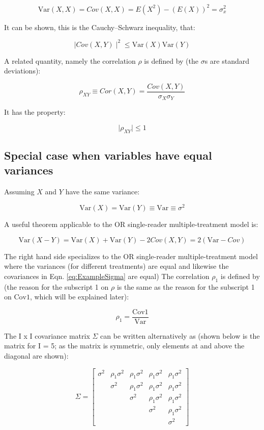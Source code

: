 \documentclass[
]{book}
\begin{document}
\[\text{Var}(X,X) = Cov(X,X)=E(X^2)-(E(X))^2=\sigma_x^2\]

It can be shown, this is the Cauchy--Schwarz inequality, that:

\[\mid Cov(X,Y) \mid^2 \le \text{Var}(X)\text{Var}(Y)\]

A related quantity, namely the correlation \(\rho\) is defined by (the \(\sigma\)s are standard deviations):

\[\rho_{XY} \equiv Cor(X,Y)=\frac{Cov(X,Y)}{\sigma_X \sigma_Y}\]

It has the property:

\[\mid \rho_{XY} \mid \le 1\]

\hypertarget{or-method-intro-elementary-stats-equal-variance}{%
\subsection{Special case when variables have equal variances}\label{or-method-intro-elementary-stats-equal-variance}}

Assuming \(X\) and \(Y\) have the same variance:

\[\text{Var}(X)=\text{Var}(Y)\equiv \text{Var}\equiv \sigma^2\]

A useful theorem applicable to the OR single-reader multiple-treatment model is:

\begin{equation}
\text{Var}(X-Y)=\text{Var}(X)+\text{Var}(Y)-2Cov(X,Y)=2(\text{Var}-Cov)
\label{eq:UsefulTheorem}
\end{equation}

The right hand side specializes to the OR single-reader multiple-treatment model where the variances (for different treatments) are equal and likewise the covariances in Eqn. \eqref{eq:ExampleSigma} are equal) The correlation \(\rho_1\) is defined by (the reason for the subscript 1 on \(\rho\) is the same as the reason for the subscript 1 on \(\text{Cov1}\), which will be explained later):

\[\rho_1=\frac{\text{Cov1}}{\text{Var}}\]

The I x I covariance matrix \(\Sigma\) can be written alternatively as (shown below is the matrix for I = 5; as the matrix is symmetric, only elements at and above the diagonal are shown):

\begin{equation}
\Sigma = 
\begin{bmatrix}
\sigma^2 & \rho_1\sigma^2 & \rho_1\sigma^2 & \rho_1\sigma^2 & \rho_1\sigma^2\\
& \sigma^2 & \rho_1\sigma^2 & \rho_1\sigma^2 & \rho_1\sigma^2\\
&  & \sigma^2 & \rho_1\sigma^2 & \rho_1\sigma^2\\
&  &  & \sigma^2 & \rho_1\sigma^2\\
&  &  &  & \sigma^2
\end{bmatrix}
\label{eq:CovMtrxSigmaRhoForm}
\end{equation}
\end{document}
